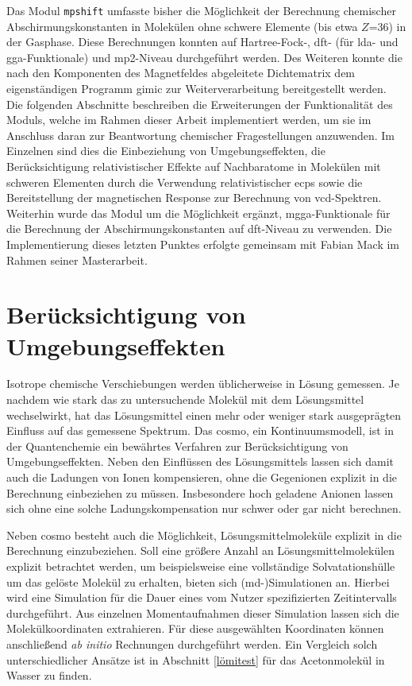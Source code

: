 Das Modul \texttt{mpshift} umfasste bisher die Möglichkeit der Berechnung chemischer Abschirmungskonstanten in Molekülen ohne schwere Elemente (bis etwa $Z$=36) in der Gasphase. Diese Berechnungen konnten auf Hartree-Fock-, \ac{dft}- (für \ac{lda}- und \ac{gga}-Funktionale) und \ac{mp2}-Niveau durchgeführt werden. Des Weiteren konnte die nach den Komponenten des Magnetfeldes abgeleitete Dichtematrix dem eigenständigen Programm \ac{gimic} zur Weiterverarbeitung bereitgestellt werden. Die folgenden Abschnitte beschreiben die Erweiterungen der Funktionalität des Moduls, welche im Rahmen dieser Arbeit implementiert werden, um sie im Anschluss daran zur Beantwortung chemischer Fragestellungen anzuwenden. Im Einzelnen sind dies die Einbeziehung von Umgebungseffekten, die Berücksichtigung relativistischer Effekte auf Nachbaratome in Molekülen mit schweren Elementen durch die Verwendung relativistischer \acp{ecp} sowie die Bereitstellung der magnetischen Response zur Berechnung von \ac{vcd}-Spektren. Weiterhin wurde das Modul um die Möglichkeit ergänzt, \ac{mgga}-Funktionale für die Berechnung der Abschirmungskonstanten auf \ac{dft}-Niveau zu verwenden. Die Implementierung dieses letzten Punktes erfolgte gemeinsam mit Fabian Mack im Rahmen seiner Masterarbeit.\supercite{mack2017} 


\section{Berücksichtigung von Umgebungseffekten}\label{umgebung}
Isotrope chemische Verschiebungen werden üblicherweise in Lösung gemessen. Je nachdem wie stark das zu untersuchende Molekül mit dem Lösungsmittel wechselwirkt, hat das Lösungsmittel einen mehr oder weniger stark ausgeprägten Einfluss auf das gemessene Spektrum. Das \acf{cosmo}\supercite{klamt1993cosmo}, ein Kontinuumsmodell, ist in der Quantenchemie ein bewährtes Verfahren zur Berücksichtigung von Umgebungseffekten. Neben den Einflüssen des Lösungsmittels lassen sich damit auch die Ladungen von Ionen  kompensieren, ohne die Gegenionen explizit in die Berechnung einbeziehen zu müssen. Insbesondere hoch geladene Anionen lassen sich ohne eine solche Ladungskompensation nur schwer oder gar nicht berechnen. 

Neben \ac{cosmo} besteht auch die Möglichkeit, Lösungsmittelmoleküle explizit in die Berechnung einzubeziehen. Soll eine größere Anzahl an Lösungsmittelmolekülen explizit betrachtet werden, um beispielsweise eine vollständige Solvatationshülle um das gelöste Molekül zu erhalten, bieten sich \mbox{(\acs{md}-)}Simulationen an. Hierbei wird eine Simulation für die Dauer eines vom Nutzer spezifizierten Zeitintervalls durchgeführt. Aus einzelnen Momentaufnahmen dieser Simulation lassen sich die Molekülkoordinaten extrahieren. Für diese ausgewählten Koordinaten können anschließend \textit{ab initio} Rechnungen durchgeführt werden. Ein Vergleich solch unterschiedlicher Ansätze ist in Abschnitt \ref{lömitest} für das Acetonmolekül in Wasser zu finden. 

